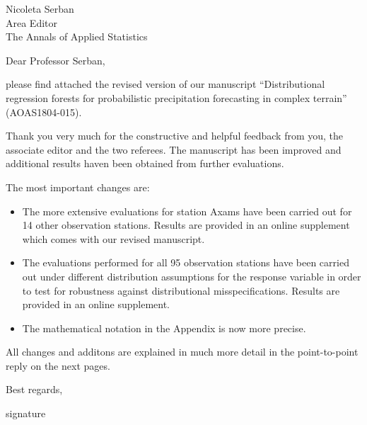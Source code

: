 \documentclass[american,foldmarks=false,noconfig]{uibklttr}
\begin{document}
\begin{letter}{
Nicoleta Serban\\
Area Editor\\
The Annals of Applied Statistics}



\opening{Dear Professor Serban,}

please find attached the revised version of our manuscript 
``Distributional regression forests for probabilistic precipitation 
forecasting in complex terrain'' (AOAS1804-015).

Thank you very much for the constructive and helpful feedback from you, 
the associate editor and the two referees. The manuscript has been 
improved and additional results haven been obtained from further evaluations.

The most important changes are:
\begin{itemize}

\item The more extensive evaluations for station Axams have been 
carried out for 14 other observation stations. Results are 
provided in an online supplement which comes with our revised manuscript.

\item The evaluations performed for all 95 observation stations 
have been carried out under different distribution assumptions 
for the response variable in order to test for robustness against
distributional misspecifications. Results are provided in an 
online supplement.

\item The mathematical notation in the Appendix is now more precise.

\end{itemize}

All changes and additons are explained in much more detail in the
point-to-point reply on the next pages. 

\closing{Best regards,
\vspace*{1cm}
}

\vspace*{-2.8cm}
\hspace*{-0.3cm}signature %

\end{letter}

\newpage
\end{document}
